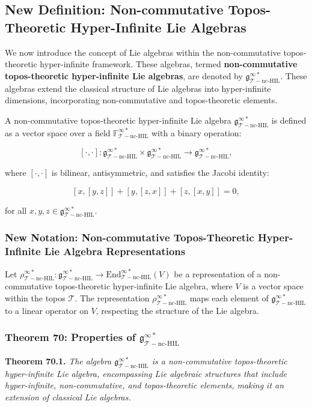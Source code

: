 \documentclass{article}
\begin{document}
\subsection{New Definition: Non-commutative Topos-Theoretic Hyper-Infinite Lie Algebras}
We now introduce the concept of Lie algebras within the non-commutative topos-theoretic hyper-infinite framework. These algebras, termed \textbf{non-commutative topos-theoretic hyper-infinite Lie algebras}, are denoted by \(\mathfrak{g}_{\mathcal{T}-\text{nc-HIL}}^{\infty *}\). These algebras extend the classical structure of Lie algebras into hyper-infinite dimensions, incorporating non-commutative and topos-theoretic elements.

A non-commutative topos-theoretic hyper-infinite Lie algebra \(\mathfrak{g}_{\mathcal{T}-\text{nc-HIL}}^{\infty *}\) is defined as a vector space over a field \(\mathbb{F}_{\mathcal{T}-\text{nc-HIL}}^{\infty *}\) with a binary operation:

\[
[\cdot, \cdot]: \mathfrak{g}_{\mathcal{T}-\text{nc-HIL}}^{\infty *} \times \mathfrak{g}_{\mathcal{T}-\text{nc-HIL}}^{\infty *} \to \mathfrak{g}_{\mathcal{T}-\text{nc-HIL}}^{\infty *},
\]

where \([\cdot, \cdot]\) is bilinear, antisymmetric, and satisfies the Jacobi identity:

\[
[x, [y, z]] + [y, [z, x]] + [z, [x, y]] = 0,
\]

for all \(x, y, z \in \mathfrak{g}_{\mathcal{T}-\text{nc-HIL}}^{\infty *}\).

\subsubsection{New Notation: Non-commutative Topos-Theoretic Hyper-Infinite Lie Algebra Representations}
Let \(\rho_{\mathcal{T}-\text{nc-HIL}}^{\infty *}: \mathfrak{g}_{\mathcal{T}-\text{nc-HIL}}^{\infty *} \to \text{End}_{\mathcal{T}-\text{nc-HIL}}^{\infty *}(V)\) be a representation of a non-commutative topos-theoretic hyper-infinite Lie algebra, where \(V\) is a vector space within the topos \(\mathcal{T}\). The representation \(\rho_{\mathcal{T}-\text{nc-HIL}}^{\infty *}\) maps each element of \(\mathfrak{g}_{\mathcal{T}-\text{nc-HIL}}^{\infty *}\) to a linear operator on \(V\), respecting the structure of the Lie algebra.

\subsubsection{Theorem 70: Properties of \(\mathfrak{g}_{\mathcal{T}-\text{nc-HIL}}^{\infty *}\)}
\textbf{Theorem 70.1.} \textit{The algebra \(\mathfrak{g}_{\mathcal{T}-\text{nc-HIL}}^{\infty *}\) is a non-commutative topos-theoretic hyper-infinite Lie algebra, encompassing Lie algebraic structures that include hyper-infinite, non-commutative, and topos-theoretic elements, making it an extension of classical Lie algebras.}
\end{document}
